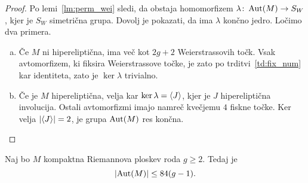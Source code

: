 \begin{proof}
Po lemi~\ref{lm:perm_wei} sledi, da obstaja homomorfizem
$\lambda \colon \operatorname{Aut}(M) \to S_W$, kjer je $S_W$ simetrična grupa.
Dovolj je pokazati, da ima $\lambda$ končno jedro. Ločimo dva
primera.

\begin{enumerate}[a)]
\item Če $M$ ni hipereliptična, ima več kot $2g + 2$
Weierstrassovih točk. Vsak avtomorfizem, ki fiksira Weierstrassove
točke, je zato po trditvi~\ref{td:fix_num} kar identiteta, zato je
$\ker \lambda$ trivialno.

\item Če je $M$ hipereliptična, velja kar
$\ker \lambda = \left\langle J\right\rangle$, kjer je $J$ hipereliptična involucija.
Ostali avtomorfizmi imajo namreč kvečjemu $4$ fiskne točke. Ker
velja $\left\lvert \left\langle J\right\rangle\right\rvert = 2$, je grupa $\operatorname{Aut}(M)$ res končna. \qedhere
\end{enumerate}
\end{proof}

\begin{izrek}[Hurwitz]
Naj bo $M$ kompaktna Riemannova ploskev roda $g \geq 2$. Tedaj je
\[
\left\lvert \operatorname{Aut}(M)\right\rvert \leq 84(g-1).
\]
\end{izrek}

